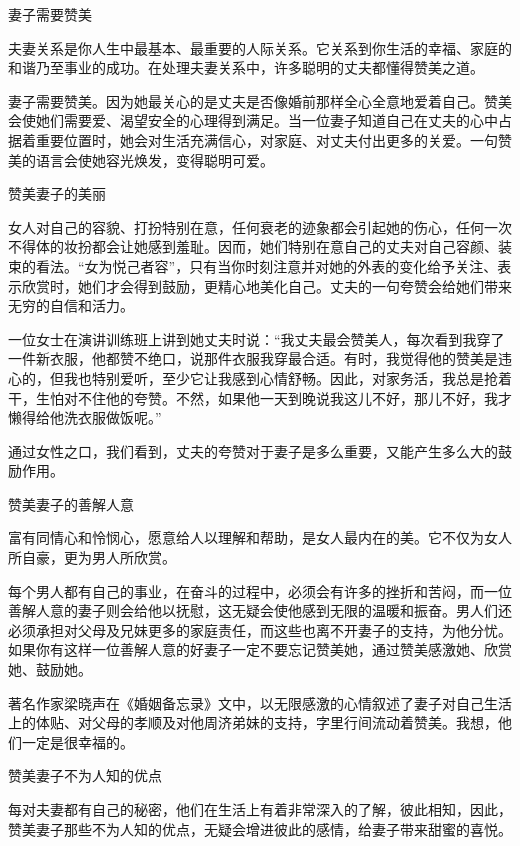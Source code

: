 \documentclass[12pt,UTF8]{ctexbook}
\begin{document}
妻子需要赞美


夫妻关系是你人生中最基本、最重要的人际关系。它关系到你生活的幸福、家庭的和谐乃至事业的成功。在处理夫妻关系中，许多聪明的丈夫都懂得赞美之道。

妻子需要赞美。因为她最关心的是丈夫是否像婚前那样全心全意地爱着自己。赞美会使她们需要爱、渴望安全的心理得到满足。当一位妻子知道自己在丈夫的心中占据着重要位置时，她会对生活充满信心，对家庭、对丈夫付出更多的关爱。一句赞美的语言会使她容光焕发，变得聪明可爱。





赞美妻子的美丽


女人对自己的容貌、打扮特别在意，任何衰老的迹象都会引起她的伤心，任何一次不得体的妆扮都会让她感到羞耻。因而，她们特别在意自己的丈夫对自己容颜、装束的看法。“女为悦己者容”，只有当你时刻注意并对她的外表的变化给予关注、表示欣赏时，她们才会得到鼓励，更精心地美化自己。丈夫的一句夸赞会给她们带来无穷的自信和活力。

一位女士在演讲训练班上讲到她丈夫时说：“我丈夫最会赞美人，每次看到我穿了一件新衣服，他都赞不绝口，说那件衣服我穿最合适。有时，我觉得他的赞美是违心的，但我也特别爱听，至少它让我感到心情舒畅。因此，对家务活，我总是抢着干，生怕对不住他的夸赞。不然，如果他一天到晚说我这儿不好，那儿不好，我才懒得给他洗衣服做饭呢。”

通过女性之口，我们看到，丈夫的夸赞对于妻子是多么重要，又能产生多么大的鼓励作用。





赞美妻子的善解人意


富有同情心和怜悯心，愿意给人以理解和帮助，是女人最内在的美。它不仅为女人所自豪，更为男人所欣赏。

每个男人都有自己的事业，在奋斗的过程中，必须会有许多的挫折和苦闷，而一位善解人意的妻子则会给他以抚慰，这无疑会使他感到无限的温暖和振奋。男人们还必须承担对父母及兄妹更多的家庭责任，而这些也离不开妻子的支持，为他分忧。如果你有这样一位善解人意的好妻子一定不要忘记赞美她，通过赞美感激她、欣赏她、鼓励她。

著名作家梁晓声在《婚姻备忘录》文中，以无限感激的心情叙述了妻子对自己生活上的体贴、对父母的孝顺及对他周济弟妹的支持，字里行间流动着赞美。我想，他们一定是很幸福的。





赞美妻子不为人知的优点


每对夫妻都有自己的秘密，他们在生活上有着非常深入的了解，彼此相知，因此，赞美妻子那些不为人知的优点，无疑会增进彼此的感情，给妻子带来甜蜜的喜悦。
\end{document}

